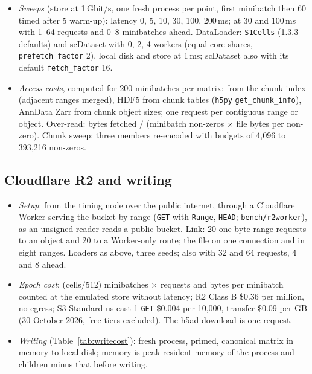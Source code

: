 \begin{itemize}
\item \emph{Sweeps} (store at 1\,Gbit/s, one fresh process per point, first minibatch then 60 timed after 5 warm-up):
  latency 0, 5, 10, 30, 100, 200\,ms; \sone{} at 30 and 100\,ms with 1--64 requests and 0--8 minibatches ahead.
  DataLoader: \texttt{S1Cells} (1.3.3 defaults) and scDataset with 0, 2, 4 workers (equal core shares,
  \texttt{prefetch\_factor} 2), local disk and store at 1\,ms; scDataset also with its default \texttt{fetch\_factor} 16.
\item \emph{Access costs}, computed for 200 minibatches per matrix: \sone{} from the chunk index (adjacent ranges
  merged), HDF5 from chunk tables (\texttt{h5py} \texttt{get\_chunk\_info}), AnnData Zarr from chunk object sizes; one
  request per contiguous range or object. Over-read: bytes fetched $/$ (minibatch non-zeros $\times$ file bytes per
  non-zero). Chunk sweep: three members re-encoded with budgets of 4,096 to 393,216 non-zeros.
\end{itemize}

\subsection{Cloudflare R2 and writing}
\begin{itemize}\itemsep 1pt
\item \emph{Setup}: from the timing node over the public internet, through a Cloudflare Worker serving the bucket by range
  (\texttt{GET} with \texttt{Range}, \texttt{HEAD}; \texttt{bench/r2worker}), as an unsigned reader reads a public
  bucket. Link: 20 one-byte range requests to an object and 20 to a Worker-only route; the \sone{} file on one connection
  and in eight ranges. Loaders as above, three seeds; \sone{} also with 32 and 64 requests, 4 and 8 ahead.
\item \emph{Epoch cost}: (cells$/$512) minibatches $\times$ requests and bytes per minibatch counted at the emulated store
  without latency; R2 Class B \$0.36 per million, no egress; S3 Standard us-east-1 \texttt{GET} \$0.004 per 10,000,
  transfer \$0.09 per GB (30 October 2026, free tiers excluded). The h5ad download is one request.
\item \emph{Writing} (Table~\ref{tab:writecost}): fresh process, primed, canonical matrix in memory to local disk; memory
  is peak resident memory of the process and children minus that before writing.
\end{itemize}

